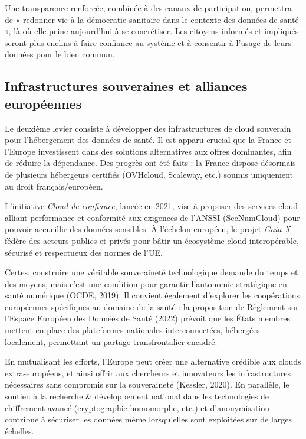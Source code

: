 \documentclass[10pt,a4paper]{article} %
\begin{document}
Une transparence renforcée, combinée à des canaux de participation, permettra de « redonner vie à la démocratie sanitaire dans le contexte des données de santé », là où elle peine aujourd’hui à se concrétiser. Les citoyens informés et impliqués seront plus enclins à faire confiance au système et à consentir à l’usage de leurs données pour le bien commun.

\subsection{Infrastructures souveraines et alliances européennes}

Le deuxième levier consiste à développer des infrastructures de cloud souverain pour l’hébergement des données de santé. Il est apparu crucial que la France et l’Europe investissent dans des solutions alternatives aux offres dominantes, afin de réduire la dépendance. Des progrès ont été faits : la France dispose désormais de plusieurs hébergeurs certifiés (OVHcloud, Scaleway, etc.) soumis uniquement au droit français/européen.

L’initiative \textit{Cloud de confiance}, lancée en 2021, vise à proposer des services cloud alliant performance et conformité aux exigences de l’ANSSI (SecNumCloud) pour pouvoir accueillir des données sensibles. À l’échelon européen, le projet \textit{Gaia-X} fédère des acteurs publics et privés pour bâtir un écosystème cloud interopérable, sécurisé et respectueux des normes de l’UE.

Certes, construire une véritable souveraineté technologique demande du temps et des moyens, mais c’est une condition pour garantir l’autonomie stratégique en santé numérique (OCDE, 2019). Il convient également d’explorer les coopérations européennes spécifiques au domaine de la santé : la proposition de Règlement sur l’Espace Européen des Données de Santé (2022) prévoit que les États membres mettent en place des plateformes nationales interconnectées, hébergées localement, permettant un partage transfrontalier encadré.

En mutualisant les efforts, l’Europe peut créer une alternative crédible aux clouds extra-européens, et ainsi offrir aux chercheurs et innovateurs les infrastructures nécessaires sans compromis sur la souveraineté (Kessler, 2020). En parallèle, le soutien à la recherche \& développement national dans les technologies de chiffrement avancé (cryptographie homomorphe, etc.) et d’anonymisation contribue à sécuriser les données même lorsqu’elles sont exploitées sur de larges échelles.
\end{document}
